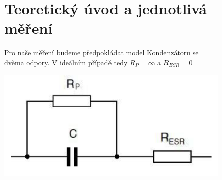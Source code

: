 \documentclass{article}
\begin{document}
\begin{figure}
  \section*{Teoretický úvod a jednotlivá měření}
  \begin{minipage}[t]{0.49\textwidth}
    \vspace{-35mm}
    Pro naše měření budeme předpokládat model Kondenzátoru se dvěma odpory.
    V ideálním případě tedy \(R_P = \infty \) a \(R_{ESR} = 0\)
  \end{minipage}
  \begin{minipage}[t]{0.49\textwidth}
    \includegraphics[width=\textwidth]{model.png}
  \end{minipage}
\end{figure}
\end{document}
